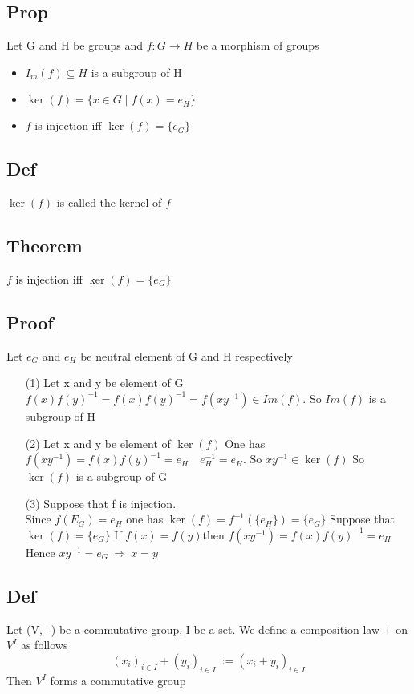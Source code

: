 \documentclass{book}
\begin{document}
\subsection{Prop}

Let G and H be groups and $f:G\rightarrow H$ be a morphism of groups\begin{itemize}
    \item $I_m(f)\subseteq H $ is a subgroup of H
    \item $\ker(f)=\{x\in G\mid f(x)=e_H\}$
    \item $f$ is injection iff $\ker(f)=\{e_G\}$
\end{itemize}
\subsection{Def}

$\ker(f)$ is called the kernel of $f$
\subsection{Theorem}
$f$ is injection iff $\ker(f)=\{e_G\}$
\subsection{Proof}
Let $e_G$ and $e_H$ be neutral element of G and H respectively
\begin{itemize}
    \item [(1)]Let x and y be element of G\\$f(x)f(y)^{-1}=f(x)f(y)^{-1}=f(xy^{-1})\in Im(f).$ So $Im(f)$ is a subgroup of H
    \item [(2)]Let x and y be element of $\ker(f)$ One has $f(xy^{-1})=f(x)f(y)^{-1}=e_H\quad e_H^{-1}=e_H.$ So $xy^{-1}\in\ker(f)$ So $\ker(f)$ is a subgroup of G
    \item [(3)]Suppose that f is injection.\\ Since $f(E_G)=e_H$ one has $\ker(f)=f^{-1}(\{e_H\})=\{e_G\}$ Suppose that $\ker(f)=\{e_G\}$ If $f(x)=f(y)$then $f(xy^{-1})=f(x)f(y)^{-1}=e_H$\\Hence $xy^{-1}=e_G\ \Rightarrow\ x=y$
\end{itemize}
\subsection{Def}

Let (V,+) be a commutative group, I be a set. We define a composition law + on $V^I$ as follows$$(x_i)_{i\in I}+(y_i)_{i\in I}\ :=(x_i+y_i)_{i\in I}$$
Then $V^I$ forms a commutative group
\end{document}
